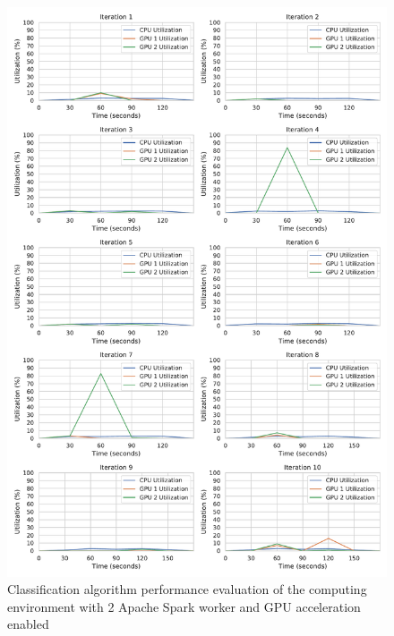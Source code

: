 \begin{figure}[h]
\centering
\includegraphics[scale=0.4]{images/07_evaluation/taxi/taxi_gpu2_performance}
\caption{Classification algorithm performance evaluation of the computing environment with 2 Apache Spark worker and GPU acceleration enabled}
\label{fig:07_mortgage_static-cpu_results}
\end{figure}

